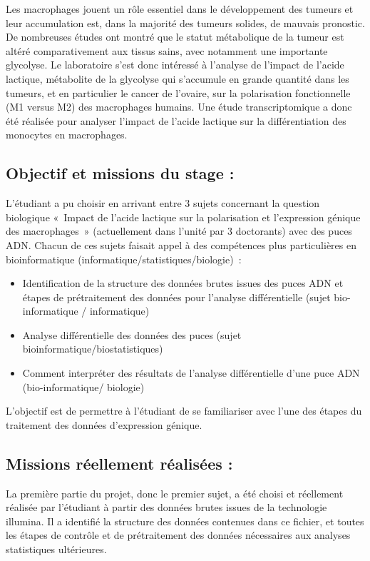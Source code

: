 \documentclass[a4paper,10pt]{article}
\begin{document}
Les macrophages jouent un rôle essentiel dans le développement des tumeurs et leur accumulation est, dans la majorité des tumeurs solides, de mauvais pronostic. De nombreuses études ont montré que le statut métabolique de la tumeur est altéré comparativement aux tissus sains, avec notamment une importante glycolyse. Le laboratoire s’est donc intéressé à l’analyse de l’impact de l’acide lactique, métabolite de la glycolyse qui s’accumule en grande quantité dans les tumeurs, et en particulier le cancer de l’ovaire, sur la polarisation fonctionnelle (M1 versus M2) des macrophages humains.
Une étude transcriptomique a donc été réalisée pour analyser l’impact de l’acide lactique sur la différentiation des monocytes en macrophages.
\subsection{Objectif et missions du stage :}
L’étudiant a pu choisir en arrivant entre 3 sujets concernant la question biologique « Impact de l’acide lactique sur la polarisation et l’expression génique des macrophages » (actuellement dans l’unité par 3 doctorants)  avec des puces ADN. Chacun de ces sujets faisait appel à des compétences plus particulières en bioinformatique (informatique/statistiques/biologie) :
\begin{itemize}
 \item Identification de la structure des données brutes issues des puces ADN et étapes de prétraitement des données pour l’analyse différentielle (sujet bio-informatique / informatique)
\item Analyse différentielle des données des puces (sujet bioinformatique/biostatistiques)
\item Comment interpréter des résultats de l’analyse différentielle d’une puce ADN (bio-informatique/ biologie)
\end{itemize}
L’objectif est de permettre à l’étudiant de se familiariser avec l’une des étapes du traitement des données d’expression génique.
\subsection{Missions réellement réalisées :}
La première partie du projet, donc le premier sujet, a été choisi et réellement réalisée par l’étudiant à partir des données brutes issues de la technologie illumina. 
Il a identifié la structure des données contenues dans ce fichier, et toutes les étapes de contrôle et de prétraitement des données nécessaires aux analyses statistiques ultérieures.
\end{document}
